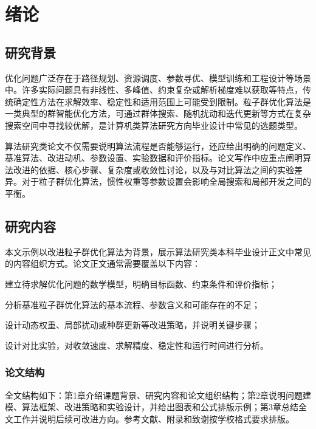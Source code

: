 \chapter{绪论}

\section{研究背景}

优化问题广泛存在于路径规划、资源调度、参数寻优、模型训练和工程设计等场景中。许多实际问题具有非线性、多峰值、约束复杂或解析梯度难以获取等特点，传统确定性方法在求解效率、稳定性和适用范围上可能受到限制。粒子群优化算法是一类典型的群智能优化方法，可通过群体搜索、随机扰动和迭代更新等方式在复杂搜索空间中寻找较优解，是计算机类算法研究方向毕业设计中常见的选题类型。

算法研究类论文不仅需要说明算法流程是否能够运行，还应给出明确的问题定义、基准算法、改进动机、参数设置、实验数据和评价指标。论文写作中应重点阐明算法改进的依据、核心步骤、复杂度或收敛性讨论，以及与对比算法之间的实验差异。对于粒子群优化算法，惯性权重等参数设置会影响全局搜索和局部开发之间的平衡。

\section{研究内容}

本文示例以改进粒子群优化算法为背景，展示算法研究类本科毕业设计正文中常见的内容组织方式。论文正文通常需要覆盖以下内容：

\begin{custenum}
  \item 建立待求解优化问题的数学模型，明确目标函数、约束条件和评价指标；
  \item 分析基准粒子群优化算法的基本流程、参数含义和可能存在的不足；
  \item 设计动态权重、局部扰动或种群更新等改进策略，并说明关键步骤；
  \item 设计对比实验，对收敛速度、求解精度、稳定性和运行时间进行分析。
\end{custenum}

\subsection{论文结构}

全文结构如下：第1章介绍课题背景、研究内容和论文组织结构；第2章说明问题建模、算法框架、改进策略和实验设计，并给出图表和公式排版示例；第3章总结全文工作并说明后续可改进方向。参考文献、附录和致谢按学校格式要求排版。
